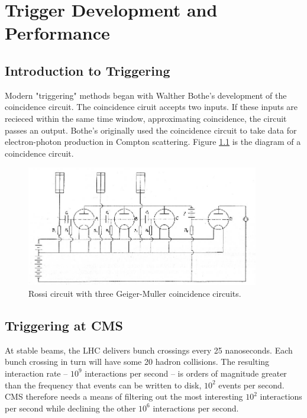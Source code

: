 
\chapter{Trigger Development and Performance}

\section{Introduction to Triggering}

Modern "triggering" methods began with Walther Bothe's development of the coincidence circuit. The coincidence ciruit accepts two inputs. If these inputs are recieced within the same time window, approximating coincidence, the circuit passes an output. Bothe's originally used the coincidence circuit to take data for electron-photon production in Compton scattering. Figure \ref{fig:ross} is the diagram of a coincidence circuit. 

\begin{figure}[h!]
\begin{centering}
\includegraphics[width=4in]{Chapter5/importfigs/Rossis-coincidence-circuit-appearing-in-Ref-65-The-selecting-resistance-on-the-right.png}
\par\end{centering}
\caption{Rossi circuit with three Geiger-Muller coincidence circuits. \label{fig:ross}}
\end{figure}

\section{Triggering at CMS}

At stable beams, the LHC delivers bunch crossings every 25 nanoseconds. Each bunch crossing in turn will have some 20 hadron collisions. The resulting interaction rate -- $10^9$ interactions per second -- is orders of magnitude greater than the frequency that events can be written to disk, $10^2$ events per second. CMS therefore needs a means of filtering out the most interesting $10^2$ interactions per second while declining the other $10^6$ interactions per second. 

